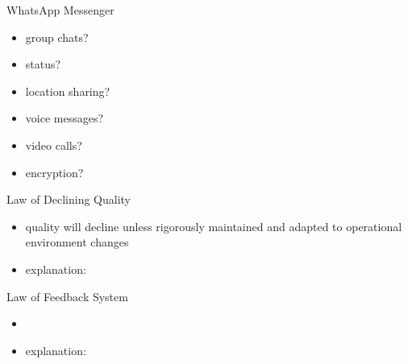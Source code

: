 \begin{frame}{\insertsubsection}
\begin{fancycolumns}
\begin{example}{WhatsApp Messenger}
			\begin{fancycolumns}[animation=none]
				\begin{itemize}
					\item group chats?
					\item status?
					\item location sharing?
				\end{itemize}
			\nextcolumn
				\begin{itemize}
					\item voice messages?
					\item video calls?
					\item encryption?
				\end{itemize}
			\end{fancycolumns}
		\end{example}
	\end{fancycolumns}
\end{frame}

\begin{frame}{\insertsubsection}
	\begin{fancycolumns}
		\begin{definition}{Law of Declining Quality\mysource{\lehmanslaws}}
			\begin{itemize}
				\item quality will decline unless rigorously maintained and adapted to operational environment changes %
				\item explanation: 
			\end{itemize}
		\end{definition}
		\begin{example}{}
		\end{example}
		\nextcolumn
		\begin{definition}{Law of Feedback System\mysource{\lehmanslaws}}
			\begin{itemize}
				\item %
				\item explanation: 
			\end{itemize}
		\end{definition}
		\begin{example}{}
		\end{example}
	\end{fancycolumns}
\end{frame}

